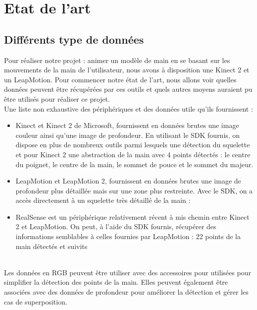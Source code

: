 \chapter{Etat de l'art}

\section{Différents type de données}
Pour réaliser notre projet : animer un modèle de main en se basant sur les mouvements de la main de l'utilisateur, nous avons à disposition une 
Kinect 2 et un LeapMotion. Pour commencer notre état de l'art, nous allons voir quelles données peuvent être récupérées par ces outils et 
quels autres moyens auraient pu être utilisés pour réaliser ce projet.\\

Une liste non exhaustive des périphériques et des données utile qu'ils fournissent : 
\begin{itemize}
  \item Kinect et Kinect 2 de Microsoft, fournissent en données brutes une image couleur ainsi qu'une image de profondeur. 
En utilisant le SDK fournis, on dispose en plus de nombreux outils parmi lesquels une détection du squelette et pour Kinect 2 
une abstraction de la main avec 4 points détectés : le centre du poignet, le centre de la main, le sommet de pouce et le sommet du majeur. 
  \item LeapMotion et LeapMotion 2, fournissent en données brutes une image de profondeur plus détaillée mais sur une zone 
plus restreinte. Avec le SDK, on a accès directement à un squelette très détaillé de la main :
  \item RealSense est un périphérique relativement récent à mis chemin entre Kinect 2 et LeapMotion. On peut, à l'aide du SDK fournis, récupérer des informations semblables à celles fournies par LeapMotion : 
  22 points de la main détectés et suivits
\end{itemize}
\ \\
Les données en RGB peuvent être utiliser avec des accessoires pour utilisées pour simplifier la détection des points de la main. \cite{wang2009real} 
Elles peuvent également être associées avec des données de profondeur pour améliorer la détection et gérer les cas de superposition. \cite{van2011combining}

